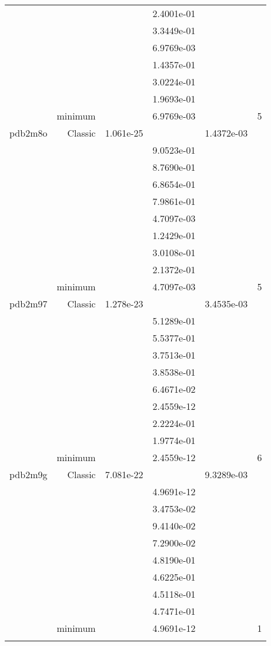 \begin{xltabular}{\textwidth}{r|rS[table-format=1.3e+2]S[table-format=1.4e+2]S[table-format=1.4e+2]S[table-format=-1.5]}
&  &  & 2.4001e-01 & & \\
&  &  & 3.3449e-01 & & \\
&  &  & 6.9769e-03 & & \\
&  &  & 1.4357e-01 & & \\
&  &  & 3.0224e-01 & & \\
&  &  & 1.9693e-01 & & \\
& minimum &  & 6.9769e-03 & & 5 \\  \addlinespace
pdb2m8o & Classic & 1.061e-25 &  & 1.4372e-03 & \\
&  &  & 9.0523e-01 & & \\
&  &  & 8.7690e-01 & & \\
&  &  & 6.8654e-01 & & \\
&  &  & 7.9861e-01 & & \\
&  &  & 4.7097e-03 & & \\
&  &  & 1.2429e-01 & & \\
&  &  & 3.0108e-01 & & \\
&  &  & 2.1372e-01 & & \\
& minimum &  & 4.7097e-03 & & 5 \\  \addlinespace
pdb2m97 & Classic & 1.278e-23 &  & 3.4535e-03 & \\
&  &  & 5.1289e-01 & & \\
&  &  & 5.5377e-01 & & \\
&  &  & 3.7513e-01 & & \\
&  &  & 3.8538e-01 & & \\
&  &  & 6.4671e-02 & & \\
&  &  & 2.4559e-12 & & \\
&  &  & 2.2224e-01 & & \\
&  &  & 1.9774e-01 & & \\
& minimum &  & 2.4559e-12 & & 6 \\  \addlinespace
pdb2m9g & Classic & 7.081e-22 &  & 9.3289e-03 & \\
&  &  & 4.9691e-12 & & \\
&  &  & 3.4753e-02 & & \\
&  &  & 9.4140e-02 & & \\
&  &  & 7.2900e-02 & & \\
&  &  & 4.8190e-01 & & \\
&  &  & 4.6225e-01 & & \\
&  &  & 4.5118e-01 & & \\
&  &  & 4.7471e-01 & & \\
& minimum &  & 4.9691e-12 & & 1 \\  \addlinespace

\end{xltabular}
